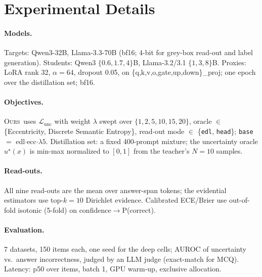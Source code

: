 \documentclass[11pt]{article}
\newcommand{\ours}{\textsc{Ours}}
\begin{document}
\section{Experimental Details}\label{app:details}
\paragraph{Models.} Targets: Qwen3-32B, Llama-3.3-70B (bf16; 4-bit for grey-box read-out
and label generation). Students: Qwen3 $\{0.6,1.7,4\}$B, Llama-3.2/3.1 $\{1,3,8\}$B.
Proxies: LoRA rank 32, $\alpha{=}64$, dropout 0.05, on
\{q,k,v,o,gate,up,down\}\_proj; one epoch over the distillation set; bf16.
\paragraph{Objectives.} \ours\ uses $\mathcal{L}_{\text{unc}}$ with weight $\lambda$ swept
over $\{1,2,5,10,15,20\}$, oracle $\in$ \{Eccentricity, Discrete Semantic Entropy\},
read-out mode $\in$ \{\texttt{edl}, \texttt{head}\}; \texttt{base} $=$ edl$\cdot$ecc$\cdot
\lambda5$. Distillation set: a fixed 400-prompt mixture; the uncertainty oracle
$u^\star(x)$ is min-max normalized to $[0,1]$ from the teacher's $N{=}10$ samples.
\paragraph{Read-outs.} All nine read-outs are the mean over answer-span tokens; the
evidential estimators use top-$k{=}10$ Dirichlet evidence. Calibrated ECE/Brier use
out-of-fold isotonic (5-fold) on confidence$\to$P(correct).
\paragraph{Evaluation.} 7 datasets, 150 items each, one seed for the deep cells; AUROC of
uncertainty vs.\ answer incorrectness, judged by an LLM judge (exact-match for MCQ).
Latency: p50 over items, batch 1, GPU warm-up, exclusive allocation.
\end{document}
